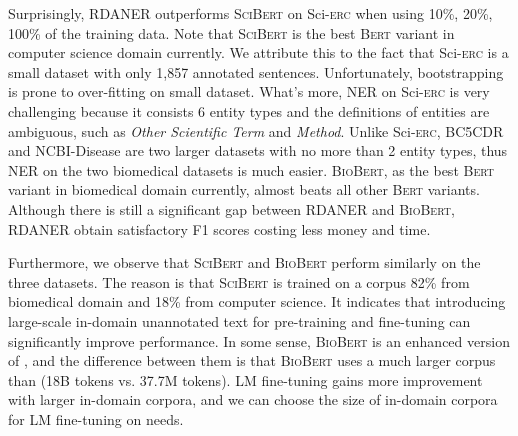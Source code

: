 \documentclass[10pt, conference, compsocconf]{IEEEtran}
\newcommand{\bert}{\textsc{Bert}\xspace}
\newcommand{\scibert}{\textsc{SciBert}\xspace}
\newcommand{\biobert}{\textsc{BioBert}\xspace}
\newcommand{\Scierc}{\textsc{S}ci-\textsc{erc}\xspace}
\newcommand{\rdaner}{\textsc{RDANER}\xspace}
\newcommand{\bertbio}{\xspace}
\begin{document}
Surprisingly, \rdaner outperforms \scibert on \Scierc when using 10\%, 20\%, 100\% of the training data. 
Note that \scibert is the best \bert variant in computer science domain currently. 
We attribute this to the fact that \Scierc is a small dataset with only 1,857 annotated sentences.
Unfortunately, bootstrapping is prone to over-fitting on small dataset.
What's more, NER on \Scierc is very challenging because it consists 6 entity types 
and the definitions of entities are ambiguous, such as \textit{Other Scientific Term} and \textit{Method}. 
Unlike \Scierc, BC5CDR and NCBI-Disease are two larger datasets with no more than 2 entity types, thus
NER on the two biomedical datasets is much easier.
\biobert, as the best \bert variant in biomedical domain currently, almost beats all other \bert variants. 
Although there is still a significant gap between \rdaner and \biobert, \rdaner obtain satisfactory
F1 scores costing less money and time. 

Furthermore, we observe that \scibert and \biobert perform similarly on the three datasets. 
The reason is that \scibert is trained on a corpus 82\% from biomedical domain and 18\% from computer science.
It indicates that introducing large-scale in-domain unannotated text for pre-training and fine-tuning
can significantly improve performance. 
In some sense, \biobert is an enhanced version of \bertbio , and the difference between them
is that \biobert uses a much larger corpus than \bertbio (18B tokens vs. 37.7M tokens).
LM fine-tuning gains more improvement with larger in-domain corpora, and we can 
choose the size of in-domain corpora for LM fine-tuning on needs.
\end{document}
